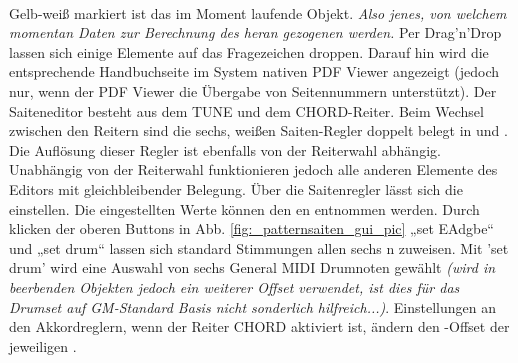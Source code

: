 \documentclass[10pt,final,a4paper]{report}
\begin{document}
~

Gelb-weiß markiert ist das im Moment laufende Objekt.\textit{ Also jenes, von welchem momentan Daten zur Berechnung des  heran gezogenen werden.}
%
%
%
Per Drag'n'Drop lassen sich einige Elemente auf das Fragezeichen droppen. Darauf hin wird die entsprechende Handbuchseite im System nativen PDF Viewer angezeigt (jedoch nur, wenn der PDF Viewer die Übergabe von Seitennummern unterstützt).
%
%
%
Der Saiteneditor besteht aus dem TUNE und dem CHORD-Reiter. Beim Wechsel zwischen den Reitern sind die sechs, weißen Saiten-Regler doppelt belegt in  und . Die Auflösung dieser Regler ist ebenfalls von der Reiterwahl abhängig. Unabhängig von der Reiterwahl funktionieren jedoch alle anderen Elemente des Editors mit gleichbleibender Belegung.
%
%
%
Über die Saitenregler lässt sich die  einstellen. Die eingestellten Werte können den en entnommen werden.
%
%
%
Durch klicken der oberen Buttons in Abb. \ref{fig:_patternsaiten_gui_pic} „set EAdgbe“ und „set drum“ lassen sich standard Stimmungen allen sechs n zuweisen. Mit 'set drum' wird eine Auswahl von sechs General MIDI Drumnoten gewählt \textit{(wird in beerbenden Objekten jedoch ein weiterer Offset verwendet, ist dies für das Drumset auf GM-Standard Basis nicht sonderlich hilfreich...)}.
%
%
%
Einstellungen an den Akkordreglern, wenn der Reiter CHORD aktiviert ist, ändern den -Offset der jeweiligen .

~
\end{document}
